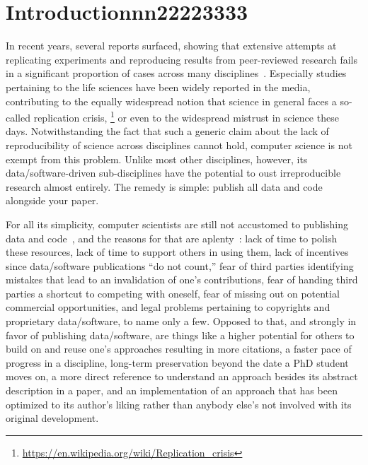\section{Introductionnn22223333}

In recent years, several reports surfaced, showing that extensive attempts at replicating experiments and reproducing results from peer-reviewed research fails in a significant proportion of cases across many disciplines~\cite{ionnadis:2005,anderson:2017}. Especially studies pertaining to the life sciences have been widely reported in the media, contributing to the equally widespread notion that science in general faces a so-called replication crisis,%
\footnote{\scriptsize\url{https://en.wikipedia.org/wiki/Replication_crisis}}
or even to the widespread mistrust in science these days. Notwithstanding the fact that such a generic claim about the lack of reproducibility of science across disciplines cannot hold, computer science is not exempt from this problem. Unlike most other disciplines, however, its data/software-driven sub-disciplines have the potential to oust irreproducible research almost entirely. The remedy is simple: publish all data and code alongside your paper.

For all its simplicity, computer scientists are still not accustomed to publishing data and code~\cite{collberg:2015}, and the reasons for that are aplenty~\cite{stodden:2010}: lack of time to polish these resources, lack of time to support others in using them, lack of incentives since data/software publications ``do not count,'' fear of third parties identifying mistakes that lead to an invalidation of one's contributions, fear of handing third parties a shortcut to competing with oneself, fear of missing out on potential commercial opportunities, and legal problems pertaining to copyrights and proprietary data/software, to name only a few.
Opposed to that, and strongly in favor of publishing data/software, are things like a higher potential for others to build on and reuse one's approaches resulting in more citations, a faster pace of progress in a discipline, long-term preservation beyond the date a PhD student moves on, a more direct reference to understand an approach besides its abstract description in a paper, and an implementation of an approach that has been optimized to its author's liking rather than anybody else's not involved with its original development.

